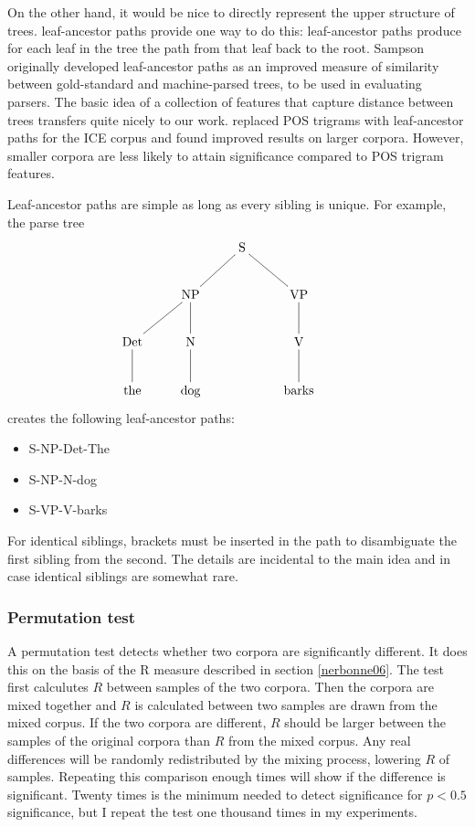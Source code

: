 \documentclass[11pt]{article}
\begin{document}
On the other hand, it would be nice to directly represent the upper
structure of trees.  leaf-ancestor paths provide one way to
do this: leaf-ancestor paths produce for each leaf in the tree the
path from that leaf back to the root. Sampson originally developed
leaf-ancestor paths as an improved measure of similarity between
gold-standard and machine-parsed trees, to be used in evaluating
parsers. The basic idea of a collection of features that capture
distance between trees transfers quite nicely to our
work.  replaced POS trigrams with leaf-ancestor
paths for the ICE corpus and found improved results on larger
corpora. However, smaller corpora are less likely to attain significance
compared to POS trigram features.

Leaf-ancestor paths are simple as long as every sibling is unique. For
example, the parse tree
\[\xymatrix{
  &&\textrm{S} \ar@{-}[dl] \ar@{-}[dr] &&\\
  &\textrm{NP} \ar@{-}[d] \ar@{-}[dl] &&\textrm{VP} \ar@{-}[d]\\
  \textrm{Det} \ar@{-}[d] & \textrm{N} \ar@{-}[d] && \textrm{V} \ar@{-}[d] \\
\textrm{the}& \textrm{dog} && \textrm{barks}\\}
\]
creates the following leaf-ancestor paths:

\begin{itemize}
\item S-NP-Det-The
\item S-NP-N-dog
\item S-VP-V-barks
\end{itemize}

For identical siblings, brackets must be inserted in the path to
disambiguate the first sibling from the second. The details are
incidental to the main idea and in case identical siblings are
somewhat rare.

\subsubsection{Permutation test}
\label{permutationtest}

A permutation test detects whether two corpora are significantly
different. It does this on the basis of the R measure described in
section \ref{nerbonne06}. The test first calculutes $R$ between
samples of the two corpora. Then the corpora are mixed together and
$R$ is calculated between two samples are drawn from the mixed
corpus. If the two corpora are different, $R$ should be larger between
the samples of the original corpora than $R$ from the mixed
corpus. Any real differences will be randomly redistributed by the
mixing process, lowering $R$ of samples. Repeating this comparison
enough times will show if the difference is significant. Twenty times
is the minimum needed to detect significance for $p < 0.5$
significance, but I repeat the test one thousand times in my
experiments.
\end{document}

